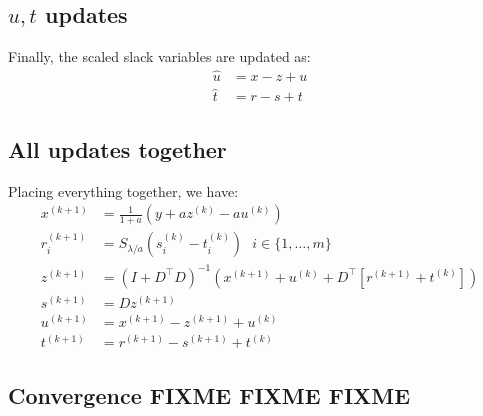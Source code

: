 \documentclass{article}
\begin{document}
\subsection{$u, t$ updates}
Finally, the scaled slack variables are updated as:
\begin{align*}
\hat{u}&=x-z+u\\
\hat{t}&=r-s+t
\end{align*}

\subsection{All updates together}
Placing everything together, we have:
\begin{align*}
x^{(k+1)}&=\frac{1}{1+a}\left(y+az^{(k)}-au^{(k)}\right)\\
r_i^{(k+1)}&=S_{\lambda/a}\left(s_i^{(k)}-t_i^{(k)}\right)~~~i\in\{1,\ldots, m\}\\
z^{(k+1)}&=(I+D^\top D)^{-1}\left(x^{(k+1)}+u^{(k)}+D^\top[r^{(k+1)}+t^{(k)}]\right)\\
s^{(k+1)}&=Dz^{(k+1)}\\
u^{(k+1)}&=x^{(k+1)}-z^{(k+1)}+u^{(k)}\\
t^{(k+1)}&=r^{(k+1)}-s^{(k+1)}+t^{(k)}
\end{align*}

\subsection{Convergence FIXME FIXME FIXME}






\end{document}

